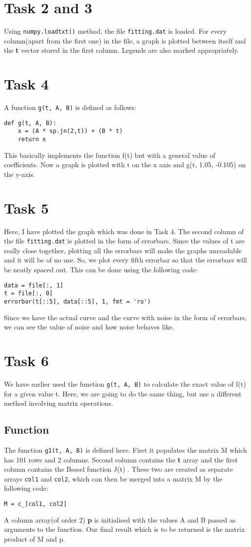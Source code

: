 \documentclass[11pt, a4paper]{article}
\begin{document}
\section{Task 2 and 3}
Using \texttt{numpy.loadtxt()} method, the file \texttt{fitting.dat} is loaded. For every column(apart from the first one) in the file, a graph is plotted between itself and the \textbf{t} vector stored in the first column. Legends are also marked appropriately.

\section{Task 4}
A function \texttt{g(t, A, B)} is defined as follows:
\begin{verbatim}
def g(t, A, B):
    x = (A * sp.jn(2,t)) + (B * t)   
    return x                      
\end{verbatim}
This basically implements the function f(t) but with a general value of coefficients. Now a graph is plotted with t on the x axis and g(t, 1.05, -0.105) on the y-axis.

\section{Task 5}
Here, I have plotted the graph which was done in Task 4. The second column of the file \texttt{fitting.dat} is plotted in the form of errorbars. Since the values of t are really close together, plotting all the errorbars will make the graphs unreadable and it will be of no use. So, we plot every fifth errorbar so that the errorbars will be neatly spaced out. This can be done using the following code:
\begin{verbatim}
data = file[:, 1]                              
t = file[:, 0]                                
errorbar(t[::5], data[::5], 1, fmt = 'ro') 
\end{verbatim}
Since we have the actual curve and the curve with noise in the form of errorbars, we can see the value of noise and how noise behaves like.

\section{Task 6}
We have earlier used the function \texttt{g(t, A, B)} to calculate the exact value of f(t) for a given value t. Here, we are going to do the same thing, but use a different method involving matrix operations.
\subsection{Function}
The function \texttt{g1(t, A, B)} is defined here. First it populates the matrix M which has 101 rows and 2 columns. Second column contains the \textbf{t} array and the first column contains the Bessel function J(t) . These two are created as separate arrays \texttt{col1} and \texttt{col2}, which can then be merged into a matrix M by the following code:
\begin{verbatim}
M = c_[col1, col2]
\end{verbatim}
A column array(of order 2) \textbf{p} is initialised with the values A and B passed as arguments to the function. Our final result which is to be returned is the matrix product of M and p. 
\end{document}
